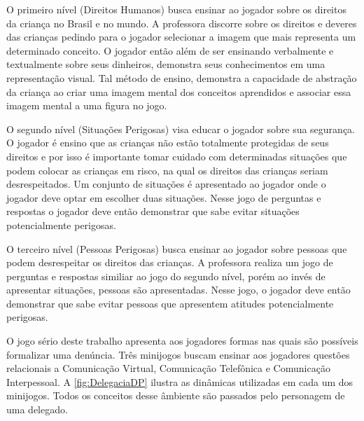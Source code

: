 O primeiro nível (Direitos Humanos) busca ensinar ao jogador sobre os direitos da criança no Brasil e no mundo. A professora discorre sobre os direitos e deveres das crianças pedindo para o jogador selecionar a imagem que mais representa um determinado conceito. O jogador então além de ser ensinando verbalmente e textualmente sobre seus dinheiros, demonstra seus conhecimentos em uma representação visual. Tal método de ensino, demonstra a capacidade de abstração da criança ao criar uma imagem mental dos conceitos aprendidos e associar essa imagem mental a uma figura no jogo. 

O segundo nível (Situações Perigosas) visa educar o jogador sobre sua segurança. O jogador é ensino que as crianças não estão totalmente protegidas de seus direitos e por isso é importante tomar cuidado com determinadas situações que podem colocar as crianças em risco, na qual os direitos das crianças seriam desrespeitados. Um conjunto de situações é apresentado ao jogador onde o jogador deve optar em escolher duas situações. Nesse jogo de perguntas e respostas o jogador deve então demonstrar que sabe evitar situações potencialmente perigosas.

O terceiro nível (Pessoas Perigosas) busca ensinar ao jogador sobre pessoas que podem desrespeitar os direitos das crianças. A professora realiza um jogo de perguntas e respostas similiar ao jogo do segundo nível, porém ao invés de apresentar situações, pessoas são apresentadas. Nesse jogo, o jogador deve então demonstrar que sabe evitar pessoas que apresentem atitudes potencialmente perigosas.


O jogo sério deste trabalho apresenta aos jogadores formas nas quais são possíveis formalizar uma denúncia. Três minijogos buscam ensinar aos jogadores questões relacionais a Comunicação Virtual, Comunicação Telefônica e Comunicação Interpessoal. A \autoref{fig:DelegaciaDP} ilustra as dinâmicas utilizadas em cada um dos minijogos. Todos os conceitos desse âmbiente são passados pelo personagem de uma delegado. 

